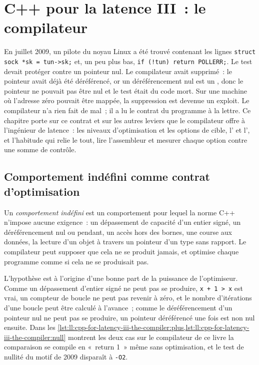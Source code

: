 \chapter{C++ pour la latence III~: le compilateur}\label{ch:ll:cpp-for-latency-iii-the-compiler}

En juillet 2009, un pilote du noyau Linux a été trouvé contenant les lignes \texttt{struct sock *sk = tun->sk;} et, un peu
plus bas, \texttt{if (!tun) return POLLERR;}. Le test devait protéger contre un pointeur nul. Le compilateur avait
supprimé~: le pointeur avait déjà été déréférencé, or un déréférencement nul est un , donc le pointeur ne pouvait pas être nul et le test était
du code mort. Sur une machine où l'adresse zéro pouvait être mappée, la suppression est devenue un exploit. Le
compilateur n'a rien fait de mal~; il a lu le contrat du programme à la lettre. Ce chapitre porte sur ce contrat et sur les
autres leviers que le compilateur offre à l'ingénieur de latence~: les niveaux d'optimisation et les options de cible, l'
et l', et l'habitude qui relie le tout, lire l'assembleur et mesurer chaque option contre une somme de contrôle.

\section{Comportement indéfini comme contrat d'optimisation}

\begin{definition}\label{def:ll:cpp-for-latency-iii-the-compiler:ub}
Un \emph{comportement indéfini} est un comportement pour lequel la norme C++ n'impose aucune exigence~:
un dépassement de capacité d'un entier signé, un déréférencement nul ou pendant, un accès hors des bornes, une course aux données, la lecture d'un objet à travers
un pointeur d'un type sans rapport. Le compilateur peut supposer que cela ne se produit jamais, et optimise chaque programme comme si cela ne se produisait pas.
\end{definition}

L'hypothèse est à l'origine d'une bonne part de la puissance de l'optimiseur. Comme un dépassement d'entier signé ne peut pas se produire, \texttt{x + 1 > x}
est vrai, un compteur de boucle ne peut pas revenir à zéro, et le nombre d'itérations d'une boucle peut être calculé à l'avance~; comme le déréférencement d'un pointeur nul ne peut pas
se produire, un pointeur déréférencé une fois est non nul ensuite. Dans les
\cref{lst:ll:cpp-for-latency-iii-the-compiler:plus,lst:ll:cpp-for-latency-iii-the-compiler:null} montrent les deux cas sur le compilateur de ce livre
la comparaison se compile en «~return 1~» même sans optimisation, et le test de nullité du motif de 2009 disparaît
à \texttt{-O2}.

